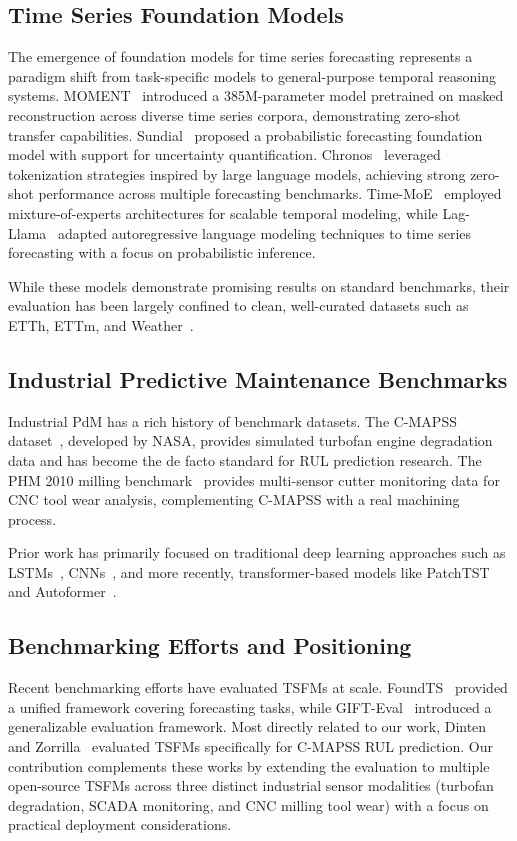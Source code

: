 \subsection{Time Series Foundation Models}

The emergence of foundation models for time series forecasting represents a paradigm shift from task-specific models to general-purpose temporal reasoning systems. MOMENT~\cite{goswami2024moment} introduced a 385M-parameter model pretrained on masked reconstruction across diverse time series corpora, demonstrating zero-shot transfer capabilities. Sundial~\cite{ekambaram2024sundial} proposed a probabilistic forecasting foundation model with support for uncertainty quantification. Chronos~\cite{ansari2024chronos} leveraged tokenization strategies inspired by large language models, achieving strong zero-shot performance across multiple forecasting benchmarks. Time-MoE~\cite{time_moe2024} employed mixture-of-experts architectures for scalable temporal modeling, while Lag-Llama~\cite{lag_llama2023} adapted autoregressive language modeling techniques to time series forecasting with a focus on probabilistic inference.

While these models demonstrate promising results on standard benchmarks, their evaluation has been largely confined to clean, well-curated datasets such as ETTh, ETTm, and Weather~\cite{zhou2021informer}.

\subsection{Industrial Predictive Maintenance Benchmarks}

Industrial PdM has a rich history of benchmark datasets. The C-MAPSS dataset~\cite{saxena2008cmapss}, developed by NASA, provides simulated turbofan engine degradation data and has become the de facto standard for RUL prediction research. The PHM 2010 milling benchmark~\cite{phm2010milling} provides multi-sensor cutter monitoring data for CNC tool wear analysis, complementing C-MAPSS with a real machining process.

Prior work has primarily focused on traditional deep learning approaches such as LSTMs~\cite{zhao2019lstm}, CNNs~\cite{zheng2017cnn}, and more recently, transformer-based models like PatchTST~\cite{nie2022patchtst} and Autoformer~\cite{wu2021autoformer}.

\subsection{Benchmarking Efforts and Positioning}

Recent benchmarking efforts have evaluated TSFMs at scale. FoundTS~\cite{foundts2024} provided a unified framework covering forecasting tasks, while GIFT-Eval~\cite{gifteval2024} introduced a generalizable evaluation framework. Most directly related to our work, Dinten and Zorrilla~\cite{dinten2025} evaluated TSFMs specifically for C-MAPSS RUL prediction. Our contribution complements these works by extending the evaluation to multiple open-source TSFMs across three distinct industrial sensor modalities (turbofan degradation, SCADA monitoring, and CNC milling tool wear) with a focus on practical deployment considerations.
